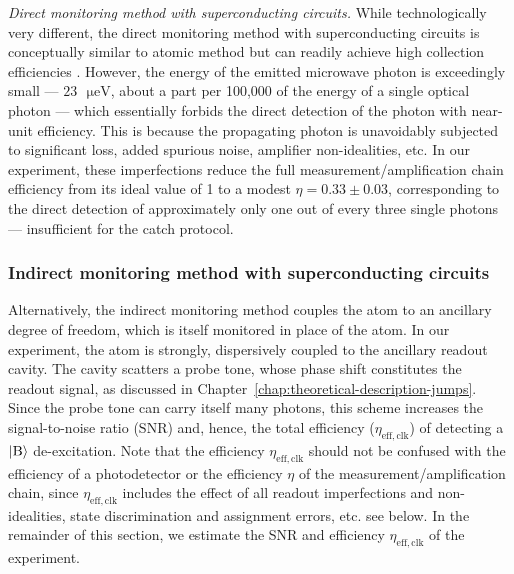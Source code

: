 \emph{Direct monitoring method with superconducting circuits.} While
technologically very different, the direct monitoring method with
superconducting circuits is conceptually similar to atomic method
but can readily achieve high collection efficiencies \citep{Katz2008,Vijay2011,Riste2012-qubit-measure-reset,Vijay2012,Hatridge2013,Murch2013a,deLange2014,Roch2014,Weber2014,Campagne-Ibarcq2014,Macklin2015,Campagne2016-Fluorescence,Campagne-Ibarcq2016,Hacohen-Gourgy2016-non-comm,Naghiloo2016,White2016,Ficheux2017,Naghiloo2017-thermo,Tan2017,Hacohen-Gourgy2018,Heinsoo2018,Bultink2018}.
 However, the energy of the emitted microwave photon is exceedingly
small --- $23\text{ }\mathrm{\mu eV}$, about a part per 100,000
of the energy of a single optical photon --- which essentially forbids
the direct detection of the photon with near-unit efficiency. This
is because the propagating photon is unavoidably subjected to significant
loss, added spurious noise, amplifier non-idealities, etc. In our
experiment, these imperfections reduce the full measurement/amplification
chain efficiency from its ideal value \citep{Hatridge2013,Macklin2015,Bultink2018}
of 1 to a modest $\eta=0.33\pm0.03$, corresponding to the direct
detection of approximately only one out of every three single photons
--- insufficient for the catch protocol.

\subsubsection{Indirect monitoring method with superconducting circuits}

Alternatively, the indirect monitoring method couples the atom to
an ancillary degree of freedom, which is itself monitored in place
of the atom. In our experiment, the atom is strongly, dispersively
coupled to the ancillary readout cavity. The cavity scatters a probe
tone, whose phase shift constitutes the readout signal, as discussed
in Chapter~\ref{chap:theoretical-description-jumps}. Since the probe
tone can carry itself many photons, this scheme increases the signal-to-noise
ratio ($\mathrm{SNR}$) and, hence, the total efficiency ($\eta_{\mathrm{eff,clk}}$)
of detecting a $|{\rm B}\rangle$ de-excitation. Note that the efficiency
$\eta_{\mathrm{eff,clk}}$ should not be confused with the efficiency
of a photodetector or the efficiency $\eta$ of the measurement/amplification
chain, since $\eta_{\mathrm{eff,clk}}$ includes the effect of all
readout imperfections and non-idealities, state discrimination and
assignment errors, etc. see below. In the remainder of this section,
we estimate the SNR and efficiency $\eta_{\mathrm{eff,clk}}$ of the
experiment.

